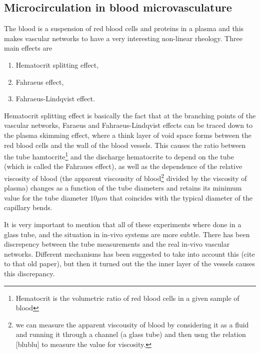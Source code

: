 \documentclass[10pt,a4paper,twocolumn]{article}
\begin{document}
	\subsection{Microcirculation in blood microvasculature}
	The blood is a suspension of red blood cells and proteins in a plasma and this makes vascular networks to have a very interesting non-linear rheology. Three main effects are 
	\begin{enumerate}
		\item Hematocrit splitting effect,
		\item Fahraeus effect,
		\item Fahraeus-Lindqvist effect.
	\end{enumerate}
	Hematocrit splitting effect is basically the fact that at the branching points of the vascular networks,  Faraeus and Fahraeus-Lindqvist effects can be traced down to the plasma skimming effect, where a think layer of void space forms between the red blood cells and the wall of the blood vessels. This causes the ratio between the tube hamtocrite\footnote{Hematocrit is the volumetric ratio of red blood cells in a given sample of blood} and the discharge hematocrite to depend on the tube (which is called the Fahraues effect), as well as the dependence of the relative viscosity of blood (the apparent viscousity of blood\footnote{we can measure the apparent viscousity of blood by considering it as a fluid and running it through a channel (a glass tube) and then usng the relation [blublu] to measure the value for viscosity.} divided by the viscosity of plasma) changes as a function of the tube diameters and retains its minimum value for the tube diameter $ 10\mu m $ that coincides with the typical diameter of the capillary bends.
	
	 It is very important to mention that all of these experiments where done in a glass tube, and the situation in in-vivo systems are more subtle. There has been discrepency between the tube measurements and the real in-vivo vascular networks. Different mechanisms has been suggested to take into account this (cite to that old paper), but then it turned out the the inner layer of the vessels causes this discrepancy.
	
\end{document}
